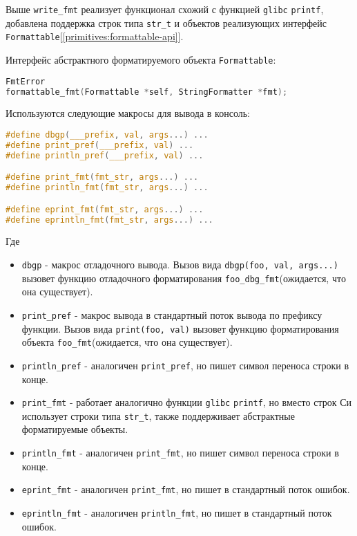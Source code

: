 \begin{itemize}
Выше \verb|write_fmt| реализует функционал схожий с функцией \verb|glibc| \verb|printf|, 
добавлена поддержка строк типа \verb|str_t| и объектов реализующих интерфейс \verb|Formattable|[\ref{primitives:formattable-api}].

Интерфейс абстрактного форматируемого объекта \verb|Formattable|:
\begin{lstlisting}[language=c, caption={Интерфейс абстрактного форматируемого объекта}, label={primitives:formattables-api}]
FmtError 
formattable_fmt(Formattable *self, StringFormatter *fmt);
\end{lstlisting}


Используются следующие макросы для вывода в консоль:
\begin{lstlisting}[language=c, caption={Макросы для вывода в консоль}, label={primitives:print-macros}]
#define dbgp(___prefix, val, args...) ...
#define print_pref(___prefix, val) ...
#define println_pref(___prefix, val) ...

#define print_fmt(fmt_str, args...) ...                                 
#define println_fmt(fmt_str, args...) ...                               

#define eprint_fmt(fmt_str, args...) ...                                
#define eprintln_fmt(fmt_str, args...) ...                              
\end{lstlisting}

Где
\begin{itemize}
    \item \verb|dbgp| - макрос отладочного вывода. Вызов вида \verb|dbgp(foo, val, args...)| вызовет функцию отладочного форматирования \verb|foo_dbg_fmt|(ожидается, что она существует).
    \item \verb|print_pref| - макрос вывода в стандартный поток вывода по префиксу функции. Вызов вида \verb|print(foo, val)| вызовет функцию форматирования объекта \verb|foo_fmt|(ожидается, что она существует).
    \item \verb|println_pref| - аналогичен \verb|print_pref|, но пишет символ переноса строки в конце.

    \item \verb|print_fmt| - работает аналогично функции \verb|glibc| \verb|printf|, но вместо строк Си использует строки типа \verb|str_t|, также поддерживает абстрактные форматируемые объекты.
    \item \verb|println_fmt| - аналогичен \verb|print_fmt|, но пишет символ переноса строки в конце.
    
    \item \verb|eprint_fmt| - аналогичен \verb|print_fmt|, но пишет в стандартный поток ошибок.
    \item \verb|eprintln_fmt| - аналогичен \verb|println_fmt|, но пишет в стандартный поток ошибок.
\end{itemize}


\end{itemize}
